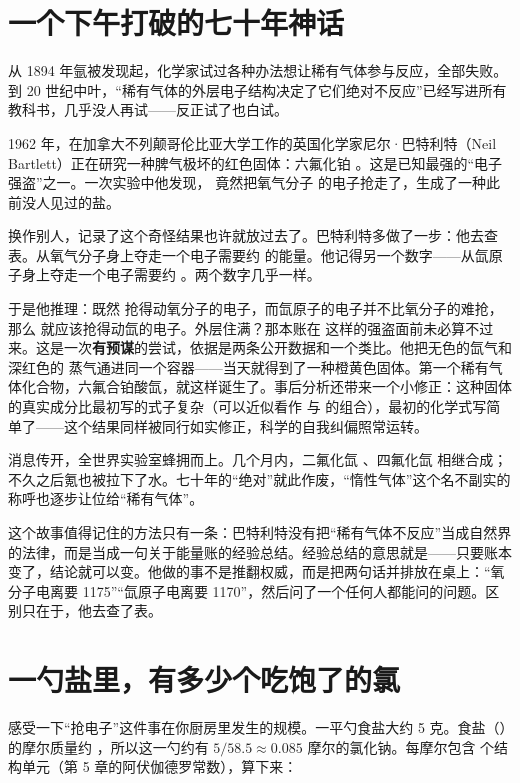 \section{一个下午打破的七十年神话}

\begin{zhengju}
从 1894 年氩被发现起，化学家试过各种办法想让稀有气体参与反应，全部失败。到 20 世纪中叶，“稀有气体的外层电子结构决定了它们绝对不反应”已经写进所有教科书，几乎没人再试——反正试了也白试。

1962 年，在加拿大不列颠哥伦比亚大学工作的英国化学家尼尔·巴特利特（Neil Bartlett）正在研究一种脾气极坏的红色固体：六氟化铂 。这是已知最强的“电子强盗”之一。一次实验中他发现， 竟然把氧气分子  的电子抢走了，生成了一种此前没人见过的盐。

换作别人，记录了这个奇怪结果也许就放过去了。巴特利特多做了一步：他去查表。从氧气分子身上夺走一个电子需要约  的能量。他记得另一个数字——从氙原子身上夺走一个电子需要约 。两个数字几乎一样。

于是他推理：既然  抢得动氧分子的电子，而氙原子的电子并不比氧分子的难抢，那么  就应该抢得动氙的电子。外层住满？那本账在  这样的强盗面前未必算不过来。这是一次\textbf{有预谋}的尝试，依据是两条公开数据和一个类比。他把无色的氙气和深红色的  蒸气通进同一个容器——当天就得到了一种橙黄色固体。第一个稀有气体化合物，六氟合铂酸氙，就这样诞生了。事后分析还带来一个小修正：这种固体的真实成分比最初写的式子复杂（可以近似看作  与  的组合），最初的化学式写简单了——这个结果同样被同行如实修正，科学的自我纠偏照常运转。

消息传开，全世界实验室蜂拥而上。几个月内，二氟化氙 、四氟化氙  相继合成；不久之后氪也被拉下了水。七十年的“绝对”就此作废，“惰性气体”这个名不副实的称呼也逐步让位给“稀有气体”。

这个故事值得记住的方法只有一条：巴特利特没有把“稀有气体不反应”当成自然界的法律，而是当成一句关于能量账的经验总结。经验总结的意思就是——只要账本变了，结论就可以变。他做的事不是推翻权威，而是把两句话并排放在桌上：“氧分子电离要 1175”“氙原子电离要 1170”，然后问了一个任何人都能问的问题。区别只在于，他去查了表。
\end{zhengju}

\section{一勺盐里，有多少个吃饱了的氯}

感受一下“抢电子”这件事在你厨房里发生的规模。一平勺食盐大约 5 克。食盐（）的摩尔质量约 ，所以这一勺约有 $5/58.5 \approx 0.085$ 摩尔的氯化钠。每摩尔包含  个结构单元（第 5 章的阿伏伽德罗常数），算下来：

